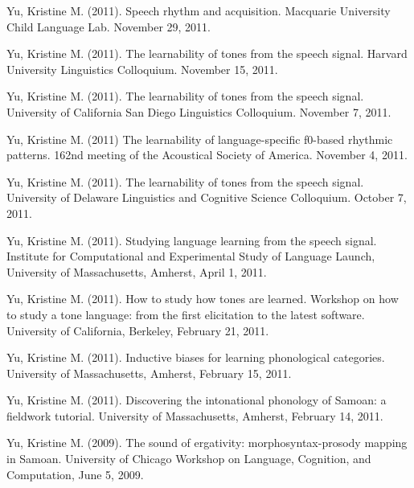 \documentclass[10pt]{article}
\begin{document}
\begin{bibenum}
    \item Yu, Kristine M. (2011). Speech rhythm and
      acquisition. Macquarie University Child Language Lab. November 29, 2011. 

    \item Yu, Kristine M. (2011). The learnability of tones from the
      speech signal. Harvard University Linguistics
      Colloquium. November 15, 2011.

    \item Yu, Kristine M. (2011). The learnability of tones from the
      speech signal. University of California San Diego Linguistics
      Colloquium. November 7, 2011. 

    \item Yu, Kristine M. (2011) The learnability of language-specific
      f0-based rhythmic patterns. 162nd meeting of the Acoustical
      Society of America. November 4, 2011. 

    \item Yu, Kristine M. (2011). The learnability of tones from the
      speech signal. University of Delaware Linguistics and Cognitive
      Science Colloquium. October 7, 2011. 

    \item Yu, Kristine M. (2011). Studying language learning from the
      speech signal. Institute for Computational and Experimental
      Study of Language Launch, University of Massachusetts, Amherst, April 1, 2011.

    \item Yu, Kristine M. (2011). How to study how tones are learned. Workshop on how to
      study a tone language: from the first elicitation to the latest
      software. University of California, Berkeley, February 21, 2011.

    \item Yu, Kristine M. (2011). Inductive biases for learning
      phonological categories. University of Massachusetts, Amherst, February 15, 2011. 

    \item Yu, Kristine M. (2011). Discovering the intonational
      phonology of Samoan: a fieldwork tutorial. University of
      Massachusetts, Amherst, February 14, 2011.  

    \item Yu, Kristine M. (2009). The sound of ergativity: morphosyntax-prosody mapping in
      Samoan. University of Chicago Workshop on Language, Cognition,
      and Computation, June 5, 2009.

\end{bibenum}
\end{document}
